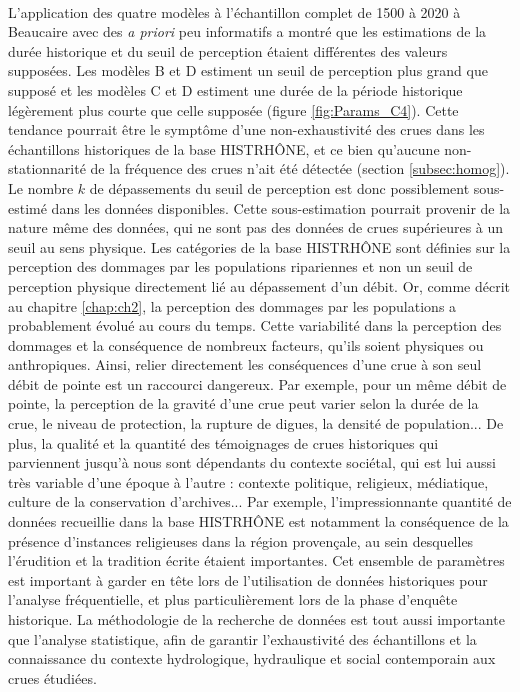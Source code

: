 	\paragraph{} L'application des quatre modèles à l'échantillon complet de 1500 à 2020 à Beaucaire avec des \textit{a priori} peu informatifs a montré que les estimations de la durée historique et du seuil de perception étaient différentes des valeurs supposées. Les modèles B et D estiment un seuil de perception plus grand que supposé et les modèles C et D estiment une durée de la période historique légèrement plus courte que celle supposée (figure \ref{fig:Params_C4}). Cette tendance pourrait être le symptôme d'une non-exhaustivité des crues dans les échantillons historiques de la base HISTRHÔNE, et ce bien qu'aucune non-stationnarité de la fréquence des crues n'ait été détectée (section \ref{subsec:homog}). Le nombre $k$ de dépassements du seuil de perception est donc possiblement sous-estimé dans les données disponibles. Cette sous-estimation pourrait provenir de la nature même des données, qui ne sont pas des données de crues supérieures à un seuil au sens physique. Les catégories de la base HISTRHÔNE sont définies sur la perception des dommages par les populations ripariennes et non un seuil de perception physique directement lié au dépassement d'un débit. Or, comme décrit au chapitre \ref{chap:ch2}, la perception des dommages par les populations a probablement évolué au cours du temps. Cette variabilité dans la perception des dommages et la conséquence de nombreux facteurs, qu'ils soient physiques ou anthropiques. Ainsi, relier directement les conséquences d'une crue à son seul débit de pointe est un raccourci dangereux. Par exemple, pour un même débit de pointe, la perception de la gravité d'une crue peut varier selon la durée de la crue, le niveau de protection, la rupture de digues, la densité de population... De plus, la qualité et la quantité des témoignages de crues historiques qui parviennent jusqu'à nous sont dépendants du contexte sociétal, qui est lui aussi très variable d'une époque à l'autre : contexte politique, religieux, médiatique, culture de la conservation d'archives... Par exemple, l'impressionnante quantité de données recueillie dans la base HISTRHÔNE est notamment la conséquence de la présence d'instances religieuses dans la région provençale, au sein desquelles l'érudition et la tradition écrite étaient importantes. Cet ensemble de paramètres est important à garder en tête lors de l'utilisation de données historiques pour l'analyse fréquentielle, et plus particulièrement lors de la phase d'enquête historique. La méthodologie de la recherche de données est tout aussi importante que l'analyse statistique, afin de garantir l'exhaustivité des échantillons et la connaissance du contexte hydrologique, hydraulique et social contemporain aux crues étudiées. 	
	
